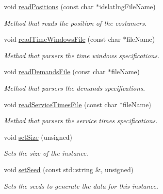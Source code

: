 \begin{DoxyCompactItemize}
void \hyperlink{class_v_r_p_t_w_instance_generator_af5235f0571082b1113f8e204b3677427}{readPositions} (const char $\ast$idslatlngFileName)
\begin{DoxyCompactList}\small\item\em Method that reads the position of the costumers. \item\end{DoxyCompactList}\item 
void \hyperlink{class_v_r_p_t_w_instance_generator_a6af11e98273c6bc2ed2e49b9152ac8bc}{readTimeWindowsFile} (const char $\ast$fileName)
\begin{DoxyCompactList}\small\item\em Method that parsers the time windows specifications. \item\end{DoxyCompactList}\item 
void \hyperlink{class_v_r_p_t_w_instance_generator_aadea1f961b19774aef9b911759386cbd}{readDemandsFile} (const char $\ast$fileName)
\begin{DoxyCompactList}\small\item\em Method that parsers the demands specifications. \item\end{DoxyCompactList}\item 
void \hyperlink{class_v_r_p_t_w_instance_generator_a0e93ce63febb5c633ae0f86cae363d49}{readServiceTimesFile} (const char $\ast$fileName)
\begin{DoxyCompactList}\small\item\em Method that parsers the service times specifications. \item\end{DoxyCompactList}\item 
void \hyperlink{class_v_r_p_t_w_instance_generator_ad4adce8a26eeac9e6078b6fc9799f0b0}{setSize} (unsigned)
\begin{DoxyCompactList}\small\item\em Sets the size of the instance. \item\end{DoxyCompactList}\item 
void \hyperlink{class_v_r_p_t_w_instance_generator_a9182f814b2990d9e95b2f2c1bb5648f0}{setSeed} (const std::string \&, unsigned)
\begin{DoxyCompactList}\small\item\em Sets the seeds to generate the data for this instance. \item\end{DoxyCompactList}\item 

\end{DoxyCompactItemize}
